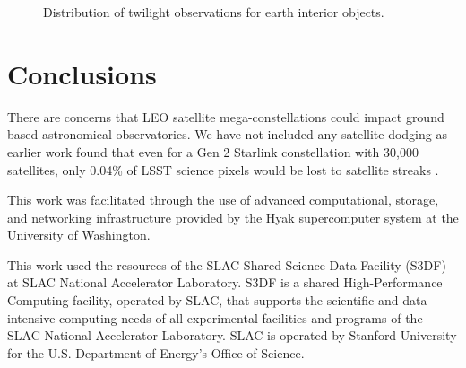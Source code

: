 \documentclass[]{aastex631}
\begin{document}
\begin{figure}
\caption{Distribution of twilight observations for earth interior objects. \label{fig:tiers_ddf}}
\end{figure}



\section{Conclusions}

There are concerns that LEO satellite mega-constellations could impact ground based astronomical observatories. We have not included any satellite dodging as earlier work found that even for a Gen 2 Starlink constellation with 30,000 satellites, only 0.04\% of LSST science pixels would be lost to satellite streaks \citep{Hu2022, Yoachim2025}.

          
{}


\begin{acknowledgments}
This work was facilitated through the use of advanced computational, storage, and networking infrastructure provided by the Hyak supercomputer system at the University of Washington.

This work used the resources of the SLAC Shared Science Data Facility (S3DF) at SLAC National Accelerator Laboratory. S3DF is a shared High-Performance Computing facility, operated by SLAC, that supports the scientific and data-intensive computing needs of all experimental facilities and programs of the SLAC National Accelerator Laboratory. SLAC is operated by Stanford University for the U.S. Department of Energy’s Office of Science.
\end{acknowledgments}
\end{document}
